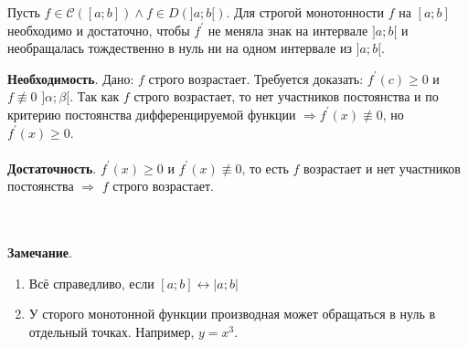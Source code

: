 \begin{corollary} Пусть $f \in \mathcal{C} ([a;b]) \wedge f \in D(]a;b[)$. Для строгой монотонности $f$ на $[a;b]$ необходимо и достаточно, чтобы $f^\prime$ не меняла знак на интервале $]a;b[$ и необращалась  тождественно в нуль ни на одном интервале из $]a;b[$.
\end{corollary}
\begin{Proof}
	\textbf{Необходимость}. Дано: $f$ строго возрастает. Требуется доказать: $f^\prime(c) \ge 0$ и $f \not\equiv 0$ $]\alpha;\beta[$. Так как $f$ строго возрастает, то нет участников постоянства и по критерию постоянства дифференцируемой функции $\Rightarrow f^\prime(x) \not\equiv 0$, но $f^\prime(x) \ge 0$.\\\\
	\textbf{Достаточность}. $f^\prime(x) \ge 0$ и $f^\prime(x) \not\equiv 0$, то есть $f$ возрастает и нет участников постоянства $\Rightarrow$ $f$ строго возрастает.
\end{Proof}\\\\
\textbf{Замечание}.
\begin{enumerate}
	\item Всё справедливо, если $[a;b] \leftrightarrow |a;b|$
	\item У сторого монотонной функции производная может обращаться в нуль в отдельный точках. Например, $y = x^3$.
\end{enumerate}
